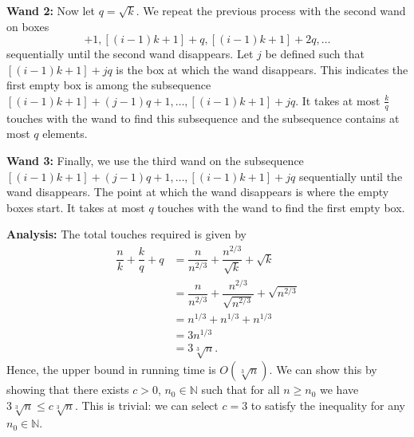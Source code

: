 \documentclass[11pt, letterpaper, titlepage]{article}
\begin{document}
\begin{enumerate}[label=\alph*)]
    \textbf{Wand 2:} Now let $q = \sqrt{k}$. We repeat the previous process with the second wand on boxes 
    \begin{equation}
        [(i - 1)k + 1] + 1, [(i - 1)k + 1] + q, [(i - 1)k + 1] + 2q, \ldots
    \end{equation}
    sequentially until the second wand disappears. Let $j$ be defined such that $[(i - 1)k + 1] + jq$ is the box at which the wand disappears. This indicates the first empty box is among the subsequence $[(i - 1)k + 1] + (j - 1)q + 1, \ldots, [(i - 1)k + 1] + jq$. It takes at most $\frac{k}{q}$ touches with the wand to find this subsequence and the subsequence contains at most $q$ elements.

    \textbf{Wand 3:} Finally, we use the third wand on the subsequence $[(i - 1)k + 1] + (j - 1)q + 1, \ldots, [(i - 1)k + 1] + jq$ sequentially until the wand disappears. The point at which the wand disappears is where the empty boxes start. It takes at most $q$ touches with the wand to find the first empty box.

    \textbf{Analysis:} The total touches required is given by
    \begin{align}
        \dfrac{n}{k} + \dfrac{k}{q} + q &= \dfrac{n}{n^{2/3}} + \dfrac{n^{2/3}}{\sqrt{k}} + \sqrt{k} \\
        &= \dfrac{n}{n^{2/3}} + \dfrac{n^{2/3}}{\sqrt{n^{2/3}}} + \sqrt{n^{2/3}} \\
        &= n^{1/3} + n^{1/3} + n^{1/3} \\
        &= 3n^{1/3} \\
        &= 3\sqrt[3]{n}.
    \end{align}
    Hence, the upper bound in running time is $O(\sqrt[3]{n})$. We can show this by showing that there exists $c > 0$, $n_0 \in \mathbb{N}$ such that for all $n \geq n_0$ we have $3\sqrt[3]{n} \leq c\sqrt[3]{n}$. This is trivial: we can select $c = 3$ to satisfy the inequality for any $n_0 \in \mathbb{N}$.


\end{enumerate}
\end{document}
